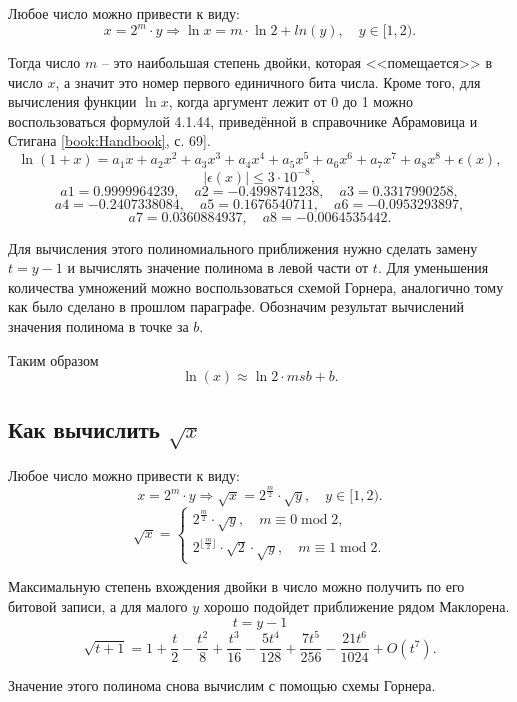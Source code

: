 \documentclass{article}
\begin{document}
Любое число можно привести к виду:
\[
x = 2^m \cdot y \Rightarrow \operatorname{ln}x = m\cdot \operatorname{ln}2 + ln(y), \quad y \in [1, 2).
\]

Тогда число $m$ -- это наибольшая степень двойки, которая <<помещается>> в число $x$, а значит это номер первого единичного бита числа. Кроме того, для вычисления функции $\operatorname{ln}x$, когда аргумент лежит от 0 до 1 можно воспользоваться формулой 4.1.44, приведённой в справочнике Абрамовица и Стигана \lbrack\ref{book:Handbook}, с. 69\rbrack].
\[
\operatorname{ln}(1 +x) = a_1x + a_2x^2 + a_3x^3 + a_4x^4 + a_5x^5 + a_6x^6 + a_7 x^7 +a_8 x^8 + \epsilon(x),
\]
\[
|\epsilon(x)| \leq 3\cdot 10^{-8},
\]
\[
a1 = 0.9999964239, \quad 
a2 = -0.4998741238, \quad
a3 = 0.3317990258, 
\]
\[
a4 = -0.2407338084, \quad
a5 = 0.1676540711, \quad
a6 = -0.0953293897,
\]
\[
a7 = 0.0360884937, \quad
a8 = -0.0064535442.
\]

Для вычисления этого полиномиального приближения нужно сделать замену $t = y - 1$ и вычислять значение полинома в левой части от $t$. Для уменьшения количества умножений можно воспользоваться схемой Горнера, аналогично тому как было сделано в прошлом параграфе. Обозначим результат вычислений значения полинома в точке за $b$.

Таким образом
\[
\operatorname{ln}(x) \approx \operatorname{ln}2 \cdot msb + b.
\]

\subsection{Как вычислить $\sqrt{x}$}

Любое число можно привести к виду:
\[
x = 2^m \cdot y \Rightarrow \sqrt{x} = 2^{\frac{m}{2}} \cdot \sqrt{y},\quad y \in [1, 2).
\]
\[
\sqrt{x} = 
\begin{cases}
    2^{\frac{m}{2}} \cdot \sqrt{y},\quad m \equiv 0 \operatorname{mod} 2, \\
    2^{\lfloor\frac{m}{2} \rfloor} \cdot \sqrt{2} \cdot \sqrt{y},\quad m \equiv 1 \operatorname{mod} 2.
\end{cases}
\]

Максимальную степень вхождения двойки в число можно получить по его битовой записи, а для малого $y$ хорошо подойдет приближение рядом Маклорена.
\[
t = y - 1
\]
\[
\sqrt{t + 1} = 1 + \frac{t}{2} - \frac{t^2}{8} + \frac{t^3}{16} - \frac{5t^4}{128} + \frac{7t^5}{256} - \frac{21t^6}{1024} + O(t^7).
\]

Значение этого полинома снова вычислим с помощью схемы Горнера. 
\end{document}
